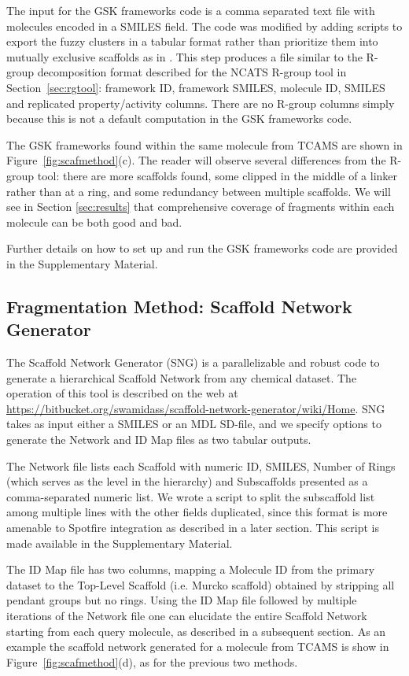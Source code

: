 \documentclass[journal=jacsat,manuscript=article]{achemso}
\newcommand*\fref[1]{Figure~\ref{fig:#1}}
\newcommand*\sref[1]{Section~\ref{sec:#1}}
\begin{document}
The input for the GSK frameworks code is a comma separated text file
with molecules encoded in a SMILES field.  The code was modified by
adding scripts to export the fuzzy clusters in a tabular format rather
than prioritize them into mutually exclusive scaffolds as in
\citeauthor{Harper2004DDclus}. This step produces a file similar to
the R-group decomposition format described for the NCATS R-group tool
in \sref{rgtool}: framework ID, framework SMILES, molecule ID, SMILES
and replicated property/activity columns.  There are no R-group
columns simply because this is not a default computation in the GSK
frameworks code.

The GSK frameworks found within the same molecule from TCAMS are shown
in \fref{scafmethod}(c).  The reader will observe several differences
from the R-group tool: there are more scaffolds found, some clipped in
the middle of a linker rather than at a ring, and some redundancy
between multiple scaffolds. We will see in Section \ref{sec:results}
that comprehensive coverage of fragments within each molecule can be
both good and bad.

Further details on how to set up and run the GSK frameworks code are
provided in the Supplementary Material.

\subsection{Fragmentation Method: Scaffold Network Generator}
\label{sec:SNG}
The Scaffold Network Generator (SNG) \cite{Matlock2013SNG} is a
parallelizable and robust code to generate a hierarchical Scaffold
Network from any chemical dataset. The operation of this tool is
described on the web at
\url{https://bitbucket.org/swamidass/scaffold-network-generator/wiki/Home}. SNG
takes as input either a SMILES or an MDL SD-file, and we specify
options to generate the Network and ID Map files as two tabular
outputs.

The Network file lists each Scaffold with numeric ID, SMILES, Number
of Rings (which serves as the level in the hierarchy) and Subscaffolds
presented as a comma-separated numeric list. We wrote a script to
split the subscaffold list among multiple lines with the other fields
duplicated, since this format is more amenable to Spotfire integration
as described in a later section.  This script is made available in the
Supplementary Material.

The ID Map file has two columns, mapping a Molecule ID from the primary dataset to the Top-Level Scaffold (i.e. Murcko scaffold) obtained by stripping all pendant groups but no rings. Using the ID Map file followed by multiple iterations of the Network file one can elucidate the entire Scaffold Network starting from each query molecule, as described in a subsequent section.  As an example the scaffold network generated for a molecule from TCAMS is show in \fref{scafmethod}(d), as for the previous two methods.
\end{document}
